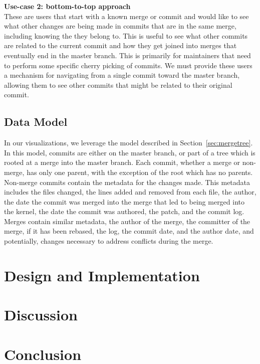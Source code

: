 \documentclass[draft]{IEEEtran}
\begin{document}
\noindent \textbf{Use-case 2: bottom-to-top approach}
\label{sec:usecase2}\\ These are users that start with a known merge or
commit and would like to see what other changes are being made in
commits that are in the same merge, including knowing the \mt
they belong to. This is useful to see what other commits are related to
the current commit and how they get joined into merges that eventually
end in the master branch. This is primarily for maintainers that need to
perform some specific cherry picking of commits. We must provide these
users a mechanism for navigating from a single commit toward the master
branch, allowing them to see other commits that might be related to
their original commit.

\subsection{Data Model}

In our visualizations, we leverage the \mt model described in
Section~\ref{sec:mergetree}. In this model, commits are either on the
master branch, or part of a tree which is rooted at a merge into the
master branch. Each commit, whether a merge or non-merge, has only one
parent, with the exception of the root which has no parents. Non-merge
commits contain the metadata for the changes made. This metadata
includes the files changed, the lines added and removed from each file,
the author, the date the commit was merged into the merge that led to
being merged into the kernel, the date the commit was authored, the
patch, and the commit log. Merges contain similar metadata, the author
of the merge, the committer of the merge, if it has been rebased, the
log, the commit date, and the author date, and potentially, changes
necessary to address conflicts during the merge.

\section{Design and Implementation}







\section{Discussion}
\label{sec:discussion}



\section{Conclusion}
\label{sec:conclusion}



\balance




\end{document}
